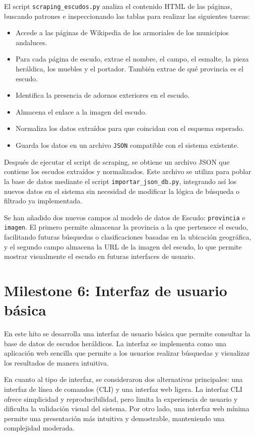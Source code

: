 El script \texttt{scraping{}\_escudos.py} analiza el contenido HTML de las páginas, buscando patrones e inspeccionando 
las tablas para realizar las siguientes tareas:

\begin{itemize}
    \item Accede a las páginas de Wikipedia de los armoriales de los municipios andaluces.
    \item Para cada página de escudo, extrae el nombre,  el campo, el esmalte, la pieza heráldica, los muebles y el 
    portador. También extrae de qué provincia es el escudo.
    \item Identifica la presencia de adornos exteriores en el escudo.
    \item Almacena el enlace a la imagen del escudo.
    \item Normaliza los datos extraídos para que coincidan con el esquema esperado.
    \item Guarda los datos en un archivo \texttt{JSON} compatible con el sistema existente.
\end{itemize}

Después de ejecutar el script de scraping, se obtiene un archivo JSON que contiene los escudos extraídos y normalizados. Este archivo se 
utiliza para poblar la base de datos mediante el script \texttt{importar{}\_json{}\_db.py}, integrando así los nuevos datos en el sistema 
sin necesidad de modificar la lógica de búsqueda o filtrado ya implementada.

Se han añadido dos nuevos campos al modelo de datos de Escudo: \texttt{provincia} e \texttt{imagen}. El primero permite almacenar la provincia
a la que pertenece el escudo, facilitando futuras búsquedas o clasificaciones basadas en la ubicación geográfica, y el segundo campo almacena 
la URL de la imagen del escudo, lo que permite mostrar visualmente el escudo en futuras interfaces de usuario.

\section{Milestone 6: Interfaz de usuario básica}
En este hito se desarrolla una interfaz de usuario básica que permite consultar la base de datos de escudos heráldicos. La interfaz se implementa
como una aplicación web sencilla que permite a los usuarios realizar búsquedas y visualizar los resultados de manera intuitiva.

En cuanto al tipo de interfaz, se consideraron dos alternativas principales: una interfaz de línea de comandos (CLI) y una interfaz web ligera. 
La interfaz CLI ofrece simplicidad y reproducibilidad, pero limita la experiencia de usuario y dificulta la validación visual del sistema. Por otro 
lado, una interfaz web mínima permite una presentación más intuitiva y demostrable, manteniendo una complejidad moderada.

